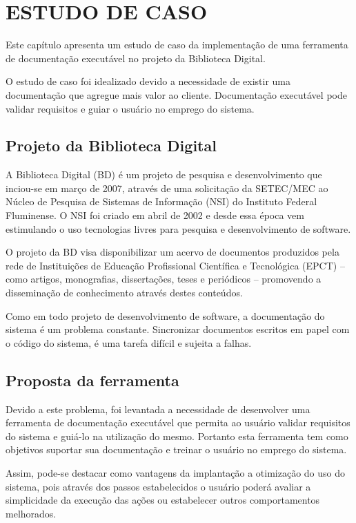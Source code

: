 \chapter{ESTUDO DE CASO}
Este capítulo apresenta um estudo de caso da implementação de uma ferramenta de documentação executável no projeto da Biblioteca Digital.

O estudo de caso foi idealizado devido a necessidade de existir uma documentação que agregue mais valor ao cliente. Documentação executável pode validar requisitos e guiar o usuário no emprego do sistema.

\section{Projeto da Biblioteca Digital} 	 	

A Biblioteca Digital (BD) é um projeto de pesquisa e desenvolvimento que inciou-se em março de 2007, através de uma solicitação da SETEC/MEC ao Núcleo de Pesquisa de Sistemas de Informação (NSI) do Instituto Federal Fluminense. O NSI foi criado em abril de 2002 e desde essa época vem estimulando o uso tecnologias livres para pesquisa e desenvolvimento de software.

O projeto da BD visa disponibilizar um acervo de documentos produzidos pela rede de Instituições de Educação Profissional Científica e Tecnológica (EPCT) – como artigos, monografias, dissertações, teses e periódicos – promovendo a disseminação de conhecimento através destes conteúdos.

Como em todo projeto de desenvolvimento de software, a documentação do sistema é um problema constante. Sincronizar documentos escritos em papel com o código do sistema, é uma tarefa difícil e sujeita a falhas. 

\section{Proposta da ferramenta}

Devido a este problema, foi levantada a necessidade de desenvolver uma ferramenta de documentação executável que permita ao usuário validar requisitos do sistema e guiá-lo na utilização do mesmo. Portanto esta ferramenta tem como objetivos suportar sua documentação e treinar o usuário no emprego do sistema.

Assim, pode-se destacar como vantagens da implantação a otimização do uso do sistema, pois através dos passos estabelecidos o usuário poderá avaliar a simplicidade da execução das ações ou estabelecer outros comportamentos melhorados.

